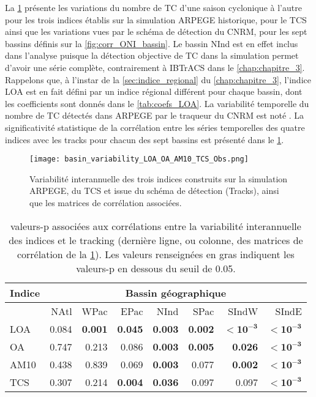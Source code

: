 \documentclass[../main.tex]{subfiles}
\begin{document}
La \cref{fig:variability_ONI} présente les variations du nombre de TC d'une saison cyclonique à l'autre pour les trois indices établis sur la simulation ARPEGE
historique, pour le TCS ainsi que les variations vues par le schéma de détection du CNRM, pour les sept bassins définis sur la \cref{fig:corr_ONI_bassin}. Le
bassin NInd est en effet inclus dans l'analyse puisque la détection objective de TC dans la simulation permet d'avoir une série complète, contrairement à
IBTrACS dans le \cref{chap:chapitre_3}. Rappelons que, à l'instar de la \cref{sec:indice_regional} du \cref{chap:chapitre_3}, l'indice LOA est en fait défini
par un indice régional différent pour chaque bassin, dont les coefficients sont donnés dans le \cref{tab:coefs_LOA}. La variabilité temporelle du nombre de TC
détectés dans ARPEGE par le traqueur du CNRM est noté . La significativité statistique de la corrélation entre les séries temporelles des
quatre indices avec les tracks pour chacun des sept bassins est présenté dans le \cref{tab:pvalues_ONI}.

\begin{figure}[p]
    \centering
    \texttt{[image: basin\_variability\_LOA\_OA\_AM10\_TCS\_Obs.png]}
    \caption{Variabilité interannuelle des trois indices construits sur la simulation ARPEGE, du TCS et issue du schéma de détection (Tracks), ainsi que les
    matrices de corrélation associées.}
    \label{fig:variability_ONI}
\end{figure}

\begin{table}[htpb]
    \centering
    \caption{valeurs-p associées aux corrélations entre la variabilité interannuelle des indices et le tracking (dernière ligne, ou colonne, des matrices de
    corrélation de la \cref{fig:variability_ONI}). Les valeurs renseignées en gras indiquent les valeurs-p en dessous du seuil de \num{0.05}.}
    \label{tab:pvalues_ONI}
    \begin{tabular}{lrrrrrrr}
        \toprule\toprule
        \multicolumn{1}{c}{Indice} & \multicolumn{7}{c}{Bassin géographique}\\
        \midrule
                                   & NAtl & WPac & EPac & NInd & SPac & SIndW & SIndE \\
        \midrule
        LOA  & \num{0.084} & \textbf{\num{0.001}} & \textbf{\num{0.045}} & \textbf{\num{0.003}} & \textbf{\num{0.002}} & $\mathbf{< 10^{-3}}$ & $\mathbf{< 10^{-3}}$ \\
        OA   & \num{0.747} & \num{0.213} & \num{0.086} & \textbf{\num{0.003}} & \textbf{\num{0.005}} & \textbf{\num{0.026}} & $\mathbf{< 10^{-3}}$ \\
        AM10 & \num{0.438} & \num{0.839} & \num{0.069} & \textbf{\num{0.003}} & \num{0.077} & \textbf{\num{0.002}} & $\mathbf{< 10^{-3}}$ \\
        TCS  & \num{0.307} & \num{0.214} & \textbf{\num{0.004}} & \textbf{\num{0.036}} & \num{0.097} & \num{0.097} & $\mathbf{< 10^{-3}}$ \\
        \bottomrule
    \end{tabular}
\end{table}
\end{document}
